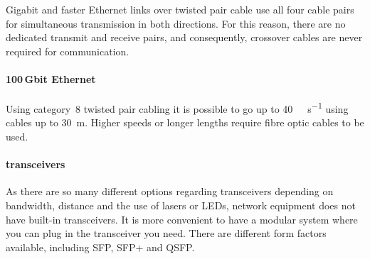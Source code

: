 Gigabit and faster Ethernet links over twisted pair cable use all four cable pairs for simultaneous transmission in both directions.
For this reason, there are no dedicated transmit and receive pairs, and consequently, crossover cables are never required for  communication.

\paragraph{100\,Gbit Ethernet}
Using category~8 twisted pair cabling it is possible to go up to \SI{40}{\giga\bit\per\second} using cables up to \SI{30}{\metre}.
Higher speeds or longer lengths require fibre optic cables to be used.




\paragraph{transceivers}
As there are so many different options regarding transceivers depending on bandwidth, distance and the use of lasers or \acsp{LED}, network equipment does not have built-in transceivers.
It is more convenient to have a modular system where you can plug in the transceiver you need.
There are different form factors available, including \acs{SFP}, \acs{SFP+} and \acs{QSFP}.

